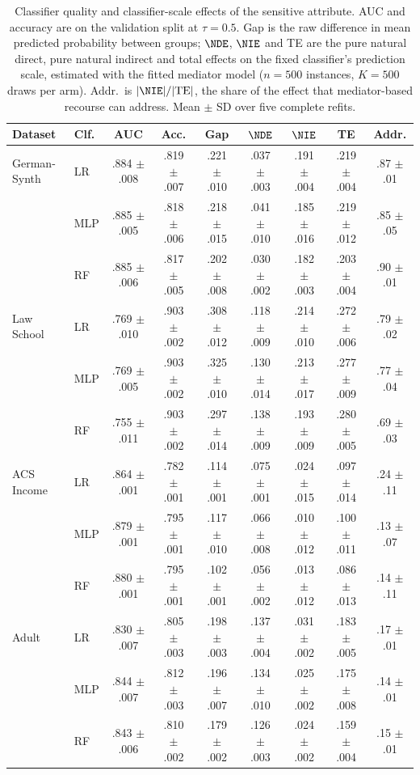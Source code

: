 \begin{table}[t]
\centering
\small
\caption{Classifier quality and classifier-scale effects of the sensitive
attribute. AUC and accuracy are on the validation split at $\tau=0.5$. Gap is
the raw difference in mean predicted probability between groups; $\NDE$,
$\NIE$ and TE are the pure natural direct, pure natural indirect and total
effects on the fixed classifier's prediction scale, estimated with the fitted
mediator model ($n=500$ instances, $K=500$ draws per arm). Addr.\ is
$|\NIE|/|\mathrm{TE}|$, the share of the effect that mediator-based recourse
can address. Mean $\pm$ SD over five complete refits.}
\label{tab:app_effects}
\setlength{\tabcolsep}{4pt}
\begin{tabular}{llcccccc c}
\hline
Dataset & Clf. & AUC & Acc. & Gap & $\NDE$ & $\NIE$ & TE & Addr. \\
\hline
German-Synth & LR & .884 $\pm$ .008 & .819 $\pm$ .007 & .221 $\pm$ .010 & .037 $\pm$ .003 & .191 $\pm$ .004 & .219 $\pm$ .004 & .87 $\pm$ .01 \\
 & MLP & .885 $\pm$ .005 & .818 $\pm$ .006 & .218 $\pm$ .015 & .041 $\pm$ .010 & .185 $\pm$ .016 & .219 $\pm$ .012 & .85 $\pm$ .05 \\
 & RF & .885 $\pm$ .006 & .817 $\pm$ .005 & .202 $\pm$ .008 & .030 $\pm$ .002 & .182 $\pm$ .003 & .203 $\pm$ .004 & .90 $\pm$ .01 \\
\hline
Law School & LR & .769 $\pm$ .010 & .903 $\pm$ .002 & .308 $\pm$ .012 & .118 $\pm$ .009 & .214 $\pm$ .010 & .272 $\pm$ .006 & .79 $\pm$ .02 \\
 & MLP & .769 $\pm$ .005 & .903 $\pm$ .002 & .325 $\pm$ .010 & .130 $\pm$ .014 & .213 $\pm$ .017 & .277 $\pm$ .009 & .77 $\pm$ .04 \\
 & RF & .755 $\pm$ .011 & .903 $\pm$ .002 & .297 $\pm$ .014 & .138 $\pm$ .009 & .193 $\pm$ .009 & .280 $\pm$ .005 & .69 $\pm$ .03 \\
\hline
ACS Income & LR & .864 $\pm$ .001 & .782 $\pm$ .001 & .114 $\pm$ .001 & .075 $\pm$ .001 & .024 $\pm$ .015 & .097 $\pm$ .014 & .24 $\pm$ .11 \\
 & MLP & .879 $\pm$ .001 & .795 $\pm$ .001 & .117 $\pm$ .010 & .066 $\pm$ .008 & .010 $\pm$ .012 & .100 $\pm$ .011 & .13 $\pm$ .07 \\
 & RF & .880 $\pm$ .001 & .795 $\pm$ .001 & .102 $\pm$ .001 & .056 $\pm$ .002 & .013 $\pm$ .012 & .086 $\pm$ .013 & .14 $\pm$ .11 \\
\hline
Adult & LR & .830 $\pm$ .007 & .805 $\pm$ .003 & .198 $\pm$ .003 & .137 $\pm$ .004 & .031 $\pm$ .002 & .183 $\pm$ .005 & .17 $\pm$ .01 \\
 & MLP & .844 $\pm$ .007 & .812 $\pm$ .003 & .196 $\pm$ .007 & .134 $\pm$ .010 & .025 $\pm$ .002 & .175 $\pm$ .008 & .14 $\pm$ .01 \\
 & RF & .843 $\pm$ .006 & .810 $\pm$ .002 & .179 $\pm$ .002 & .126 $\pm$ .003 & .024 $\pm$ .002 & .159 $\pm$ .004 & .15 $\pm$ .01 \\
\hline
\end{tabular}
\end{table}


